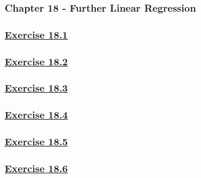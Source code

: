 \documentclass[
  11pt,
]{book}
\begin{document}
\subsubsection*{Chapter 18 - Further Linear Regression}\label{chapter-18---further-linear-regression}

\subsubsection*{\texorpdfstring{\hyperref[ex181q]{Exercise 18.1}}{Exercise 18.1}}\label{exercise-18.1-1}

\subsubsection*{\texorpdfstring{\hyperref[ex182q]{Exercise 18.2}}{Exercise 18.2}}\label{exercise-18.2-1}

\subsubsection*{\texorpdfstring{\hyperref[ex183q]{Exercise 18.3}}{Exercise 18.3}}\label{exercise-18.3-1}

\subsubsection*{\texorpdfstring{\hyperref[ex184q]{Exercise 18.4}}{Exercise 18.4}}\label{exercise-18.4-1}

\subsubsection*{\texorpdfstring{\hyperref[ex185q]{Exercise 18.5}}{Exercise 18.5}}\label{exercise-18.5-1}

\subsubsection*{\texorpdfstring{\hyperref[ex186q]{Exercise 18.6}}{Exercise 18.6}}\label{exercise-18.6-1}
\end{document}
